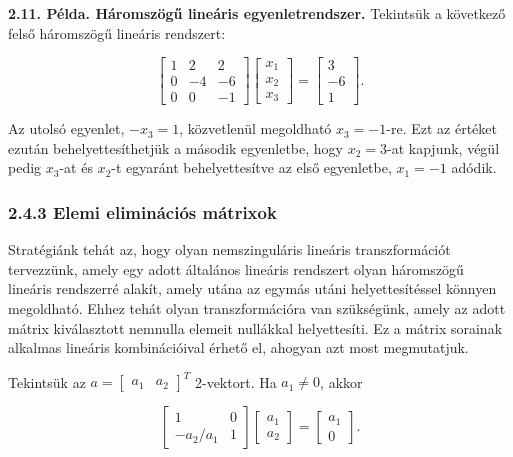 \documentclass[
  magyar,
  11pt]{article}
\begin{document}
\textbf{2.11. Példa. Háromszögű lineáris egyenletrendszer.} Tekintsük a
következő felső háromszögű lineáris rendszert:

\[\begin{bmatrix} 1 & 2 & 2 \\ 0 & -4 & -6 \\ 0 & 0 & -1 \end{bmatrix} \begin{bmatrix} x_1 \\ x_2 \\ x_3 \end{bmatrix} = \begin{bmatrix} 3 \\ -6 \\ 1 \end{bmatrix}.\]

Az utolsó egyenlet, \(-x_3 = 1\), közvetlenül megoldható
\(x_3 = -1\)-re. Ezt az értéket ezután behelyettesíthetjük a második
egyenletbe, hogy \(x_2 = 3\)-at kapjunk, végül pedig \(x_3\)-at és
\(x_2\)-t egyaránt behelyettesítve az első egyenletbe, \(x_1 = -1\)
adódik.

\subsubsection{2.4.3 Elemi eliminációs
mátrixok}\label{elemi-eliminuxe1ciuxf3s-muxe1trixok}

Stratégiánk tehát az, hogy olyan nemszinguláris lineáris transzformációt
tervezzünk, amely egy adott általános lineáris rendszert olyan
háromszögű lineáris rendszerré alakít, amely utána az egymás utáni
helyettesítéssel könnyen megoldható. Ehhez tehát olyan transzformációra
van szükségünk, amely az adott mátrix kiválasztott nemnulla elemeit
nullákkal helyettesíti. Ez a mátrix sorainak alkalmas lineáris
kombinációival érhető el, ahogyan azt most megmutatjuk.

Tekintsük az \(a = \begin{bmatrix} a_1 & a_2 \end{bmatrix}^T\)
2-vektort. Ha \(a_1 \neq 0\), akkor

\[\begin{bmatrix} 1 & 0 \\ -a_2/a_1 & 1 \end{bmatrix} \begin{bmatrix} a_1 \\ a_2 \end{bmatrix} = \begin{bmatrix} a_1 \\ 0 \end{bmatrix}.\]
\end{document}
